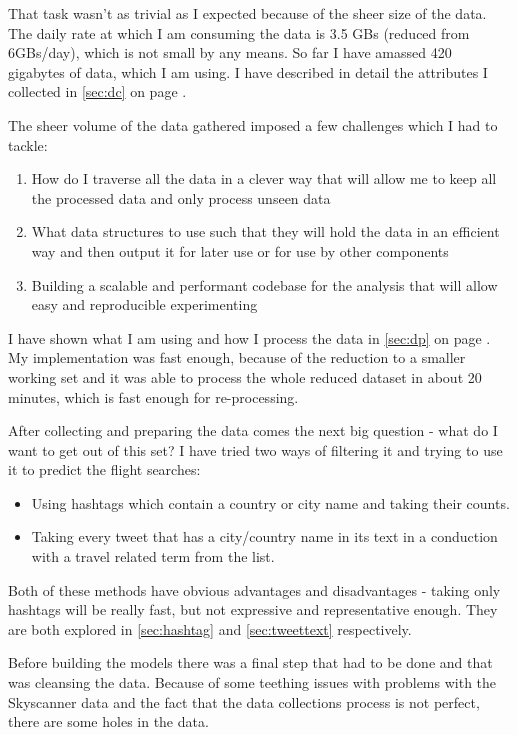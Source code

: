 \documentclass[minf,frontabs,twoside,singlespacing,parskip]{infthesis}
\begin{document}
That task wasn't as trivial as I expected because of the sheer size of the data. The daily rate at which I am consuming the data is 3.5 GBs (reduced from 6GBs/day), which is not small by any means. So far I have amassed 420 gigabytes of data, which I am using. I have described in detail the attributes I collected in \ref{sec:dc} on page \pageref{sec:dc}. 


The sheer volume of the data gathered imposed a few challenges which I had to tackle:
\begin{enumerate}
\item How do I traverse all the data in a clever way that will allow me to keep all the processed data and only process unseen data
\item What data structures to use such that they will hold the data in an efficient way and then output it for later use or for use by other components
\item Building a scalable and performant codebase for the analysis that will allow easy and reproducible experimenting
\end{enumerate}

I have shown what I am using and how I process the data in \ref{sec:dp} on page \pageref{sec:dp}. My implementation was fast enough, because of the reduction to a smaller working set and it was able to process the whole reduced dataset in about 20 minutes, which is fast enough for re-processing.

After collecting and preparing the data comes the next big question - what do I want to get out of this set? I have tried two ways of filtering it and trying to use it to predict the flight searches:
\begin{itemize}
\item Using hashtags which contain a country or city name and taking their counts.
\item Taking every tweet that has a city/country name in its text in a conduction with a travel related term from the list. 
\end{itemize}

Both of these methods have obvious advantages and disadvantages - taking only hashtags will be really fast, but not expressive and representative enough. They are both explored in  \ref{sec:hashtag} and \ref{sec:tweettext} respectively. 


Before building the models there was a final step that had to be done and that was cleansing the data. Because of some teething issues with problems with the Skyscanner data and the fact that the data collections process is not perfect, there are some holes in the data. 
\end{document}
